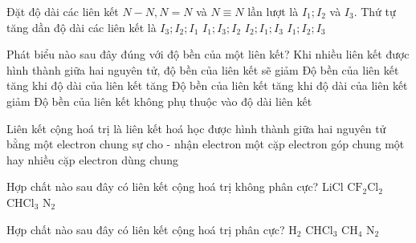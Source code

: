 \begin{ex}
	Đặt độ dài các liên kết $N-N, N=N$ và $N\equiv N$ lần lượt là $I_1; I_2$ và $I_3$. Thứ tự tăng dần độ dài các liên kết là
	\choice
	{\True$I_3; I_2; I_1$}
	{$I_1; I_3; I_2$}
	{$I_2; I_1; I_3$}
	{$I_1; I_2; I_3$}
\end{ex}
\begin{ex}
	Phát biểu nào sau đây đúng với độ bền của một liên kết?
	\choice
	{Khi nhiều liên kết được hình thành giữa hai nguyên tử, độ bền của liên kết sẽ giảm}
	{Độ bền của liên kết tăng khi độ dài của liên kết tăng}
	{\True Độ bền của liên kết tăng khi độ dài của liên kết giảm}
	{Độ bền của liên kết không phụ thuộc vào độ dài liên kết}
\end{ex}
\begin{ex}
	Liên kết cộng hoá trị là liên kết hoá học được hình thành giữa hai nguyên tử bằng
	\choice
	{một electron chung}
	{sự cho - nhận electron}
	{một cặp electron góp chung}
	{\True một hay nhiều cặp electron dùng chung}
\end{ex}

\begin{ex}
	Hợp chất nào sau đây có liên kết cộng hoá trị không phân cực?
	\choice
	{LiCl }
	{$\mathrm{CF}_2 \mathrm{Cl}_2$}
	{$\mathrm{CHCl}_3$}
	{\True $\mathrm{N}_2$}
\end{ex}

\begin{ex}
	Hợp chất nào sau đây có liên kết cộng hoá trị phân cực?
	\choice
	{$\mathrm{H}_2$}
	{\True $\mathrm{CHCl}_3$}
	{$\mathrm{CH}_4$}
	{$\mathrm{N}_2$}
\end{ex}

